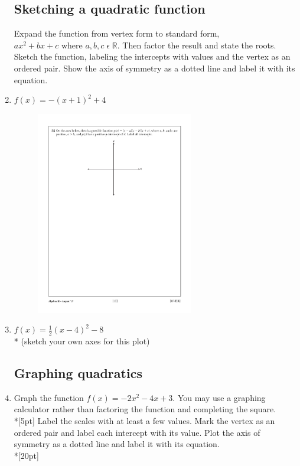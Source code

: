 \documentclass[]{book}
\begin{document}
\begin{enumerate}
\subsection*{Sketching a quadratic function}
Expand the function from vertex form to standard form, $ax^2+bx+c \text{ where } a, b, c \;  \epsilon \; \mathbb{R}$. Then factor the result and state the roots. Sketch the function, labeling the intercepts with values and the vertex as an ordered pair. Show the axis of symmetry as a dotted line and label it with its equation.
\item   $f(x)=-(x+1)^2+4$
\begin{figure}[!ht]
    \flushright
    \includegraphics[width=0.65\textwidth]{simple-axes.pdf}
\end{figure}

\item   $f(x)=\frac{1}{2}(x-4)^2-8$\\*
(sketch your own axes for this plot)

\newpage
\subsection*{Graphing quadratics}
\item Graph the function $f(x)=-2x^2-4x+3$. You may use a graphing calculator rather than factoring the function and completing the square.\\*[5pt]
Label the scales with at least a few values. Mark the vertex as an ordered pair and label each intercept with its value. Plot the axis of symmetry as a dotted line and label it with its equation.\\*[20pt]


\end{enumerate}
\end{document}
